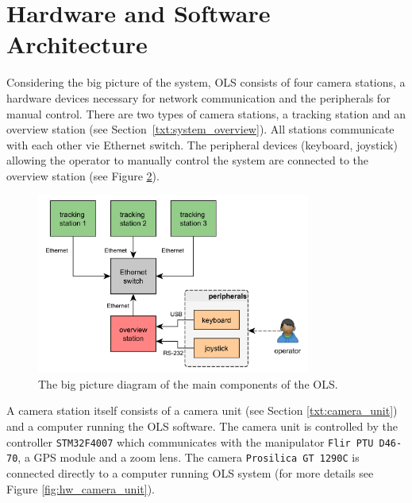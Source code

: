 \begin{figure}[htb]
\begin{minipage}{.48\textwidth}
		\label{fig:spilberk_camera_units}
	\end{minipage}
\end{figure}

\section{Hardware and Software Architecture}

Considering the big picture of the system, OLS consists of four camera stations, a hardware devices necessary for network communication and the peripherals for manual control. There are two types of camera stations, a tracking station and an overview station (see Section~\ref{txt:system_overview}). All stations communicate with each other vie Ethernet switch. The peripheral devices (keyboard, joystick) allowing the operator to manually control the system are connected to the overview station (see Figure \ref{fig:hw_ols}).

\begin{figure}[htb]
	\centering
	\includegraphics[width=9cm]{fig/hw_ols.pdf}
	\caption{The big picture diagram of the main components of the OLS.}
	\label{fig:hw_ols}
\end{figure}

A camera station itself consists of a camera unit (see Section \ref{txt:camera_unit}) and a computer running the OLS software. The camera unit is controlled by the controller \texttt{STM32F4007} which communicates with the manipulator \texttt{Flir PTU D46-70}, a GPS module and a zoom lens. The camera \texttt{Prosilica GT 1290C} is connected directly to a computer running OLS system (for more details see Figure \ref{fig:hw_camera_unit}).

